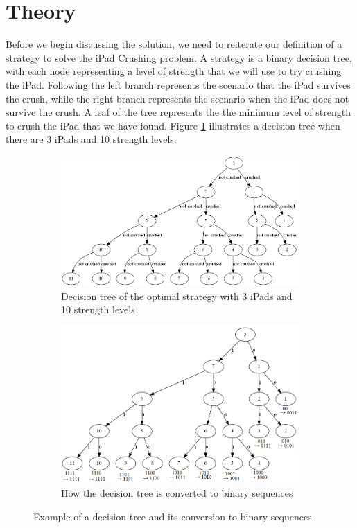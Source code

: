 \documentclass[12pt,a4paper,oneside]{report}
\begin{document}
\section{Theory}
Before we begin discussing the solution, we need to reiterate our definition of a strategy to solve the iPad Crushing problem. A strategy is a binary decision tree, with each node representing a level of strength that we will use to try crushing the iPad. Following the left branch represents the scenario that the iPad survives the crush, while the right branch represents the scenario when the iPad does not survive the crush. A leaf of the tree represents the the minimum level of strength to crush the iPad that we have found. Figure \ref{fig:comb-original} illustrates a decision tree when there are 3 iPads and 10 strength levels.

\begin{figure}
	\centering
	\begin{subfigure}{1.0\textwidth}
		\includegraphics[width=\textwidth]{comb-original}
		\caption{Decision tree of the optimal strategy with 3 iPads and 10 strength levels}
		\label{fig:comb-original}
	\end{subfigure}
	\begin{subfigure}{1.0\textwidth}
		\includegraphics[width=\textwidth]{comb-binary-sequence}
		\caption{How the decision tree is converted to binary sequences}
		\label{fig:comb-binary-sequence}
	\end{subfigure}
	\caption{Example of a decision tree and its conversion to binary sequences}
\end{figure}
\end{document}
